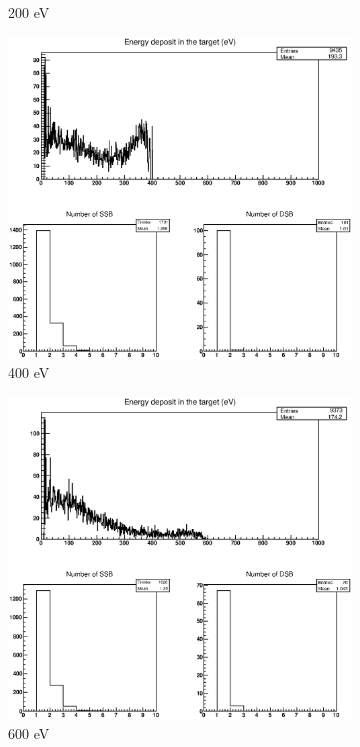 \begin{figure}
\begin{subfigure}{.5\textwidth}
  \caption{200 eV}
  \label{fig:sube2}
\end{subfigure}
\begin{subfigure}{.5\textwidth}
  \centering
  \includegraphics[width=.78\linewidth]{./Figures/e-400ev.eps}
  \caption{400 eV}
  \label{fig:sube3}
\end{subfigure}%
\begin{subfigure}{.5\textwidth}
  \centering
  \includegraphics[width=.78\linewidth]{./Figures/e-600.eps}
  \caption{600 eV}
  \label{fig:sube4}
\end{subfigure}
\begin{subfigure}{.5\textwidth}
  \centering

\end{subfigure}
\end{figure}
